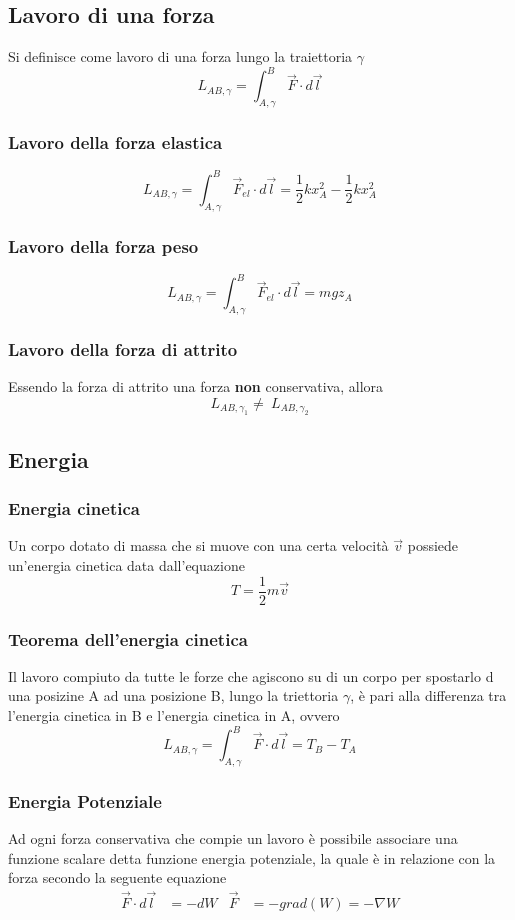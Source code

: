 \documentclass[12pt,a4paper]{report}
\begin{document}
	\subsection{Lavoro di una forza}
Si definisce come lavoro di una forza lungo la traiettoria $\gamma$
		\[\textit{L}_{AB,\gamma}= \int_{A,\gamma}^B \vec{F}\cdot d\vec{l} \]
		\subsubsection{Lavoro della forza elastica}
		\[ \textit{L}_{AB,\gamma} = \int_{A,\gamma}^B \vec{F}_{el} \cdot d\vec{l}= \frac{1}{2} k x^{2}_{A} - \frac{1}{2} k x^{2}_{A} \]
		\subsubsection{Lavoro della forza peso}
		\[ \textit{L}_{AB,\gamma} = \int_{A,\gamma}^B \vec{F}_{el} \cdot d\vec{l}= mgz_{A}\]
		\subsubsection{Lavoro della forza di attrito}
Essendo la forza di attrito una forza \textbf{non} conservativa, allora
		\[ \textit{L}_{AB,\gamma_{1}} \neq ~\textit{L}_{AB,\gamma_{2}}\]
	\subsection{Energia}
		\subsubsection{Energia cinetica}
Un corpo dotato di massa che si muove con una certa velocità $ \vec{v} $ possiede un'energia cinetica data dall'equazione
		\[ \textit{T} = \frac{1}{2} m \vec{v} \]
		\subsubsection{Teorema dell'energia cinetica}
Il lavoro compiuto da tutte le forze che agiscono su di un corpo per spostarlo d una posizine A ad una posizione B, lungo la triettoria $\gamma$, è pari alla differenza tra l'energia cinetica in B e l'energia cinetica in A, ovvero
		\[\textit{L}_{AB,\gamma}= \int_{A,\gamma}^B \vec{F}\cdot d\vec{l}=T_{B}-T_{A} \]
		\subsubsection{Energia Potenziale}
Ad ogni forza conservativa che compie un lavoro è possibile associare una funzione scalare detta funzione energia potenziale, la quale è in relazione con la forza secondo la seguente equazione
			\begin{align*}
			\vec{F}\cdot d \vec{l} &= -dW  &  \vec{F} &= -grad(W)=-\nabla W
			\end{align*}
		
\end{document}
